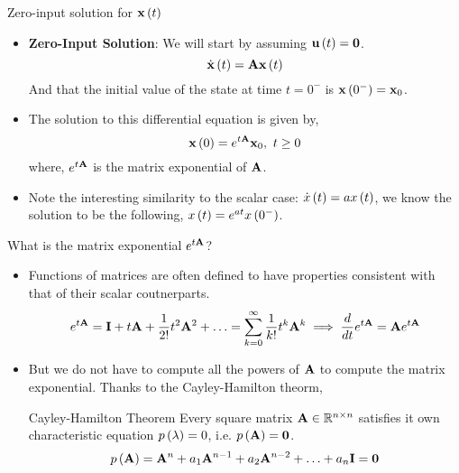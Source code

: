 \documentclass[aspectratio=169]{beamer}
\let\olditem\item
\renewcommand{\item}{\setlength{\itemsep}{\fill}\olditem}
\def\mf{\ensuremath\mathbf}
\def\mb{\ensuremath\mathbb}
\def\lp{\ensuremath\left(}
\def\rp{\ensuremath\right)}
\newcommand{\ct}[1]{\lp #1\rp}
\begin{document}
\begin{frame}[t]{Zero-input solution for $\mf{x}\ct{t}$}
\begin{itemize}
    \item \textbf{Zero-Input Solution}: We will start by assuming $\mf{u}\ct{t} = \mf{0}$.
    \[ \dot{\mf{x}}\ct{t} = \mf{A}\mf{x}\ct{t} \]
    And that the initial value of the state at time $t = 0^-$ is $\mf{x}\ct{0^-} = \mf{x}_0$. 

    \item The solution to this differential equation is given by,
    \[ \mf{x}\ct{0} = e^{t\mf{A}}\mf{x}_0, \,\, t \geq 0 \]
    where, $e^{t\mf{A}}$ is the matrix exponential of $\mf{A}$.

    \item Note the interesting similarity to the scalar case: $\dot{x}\ct{t} = ax\ct{t}$, we know the solution to be the following, $x\ct{t} = e^{at}x\ct{0^-}$. 
\end{itemize}
\end{frame}


\begin{frame}[t]{What is the matrix exponential $e^{t\mf{A}}$?}
\begin{itemize}
    \item Functions of matrices are often defined to have properties consistent with that of their scalar coutnerparts. 
    \[ e^{t\mf{A}} = \mf{I} + t\mf{A} + \frac{1}{2!}t^2\mf{A}^2 + \ldots = \sum_{k=0}^{\infty} \frac{1}{k!}t^k\mf{A}^k \implies \frac{d}{dt}e^{t\mf{A}} = \mf{A}e^{t\mf{A}} \]
    
    \item But we do not have to compute all the powers of $\mf{A}$ to compute the matrix exponential. Thanks to the Cayley-Hamilton theorm,
    
    \begin{bclogo}{Cayley-Hamilton Theorem}
    Every square matrix $\mf{A} \in \mb{R}^{n \times n}$ satisfies it own characteristic equation $p\lp \lambda \rp = 0$, i.e. $p\lp\mf{A}\rp = \mf{0}$.
    \[ p\lp\mf{A}\rp = \mf{A}^n + a_1\mf{A}^{n-1} + a_2\mf{A}^{n-2} + \ldots + a_n\mf{I} = \mf{0} \]
    \end{bclogo}

\end{itemize}
\end{frame}
\end{document}

